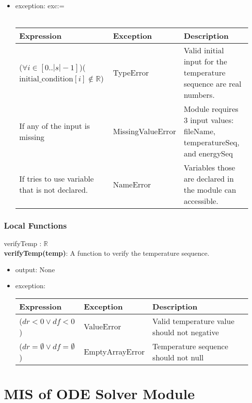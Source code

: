 \documentclass[12pt, titlepage]{article}
\begin{document}
\begin{itemize}
    
\item exception: exc:= \\ \\ 
 \begin{tabular}{p{7cm} p{3.5cm} p{4cm}}
 \hline
 \textbf{Expression} & \textbf{Exception} & \textbf{Description} \\
 \hline
     ($\forall i \in [0..|s|-1]$)($\text{initial\_condition}[i] \notin \mathbb{R}$) & TypeError & Valid initial input for the temperature sequence are real numbers. \\
  \hline
      If any of the input is missing  & MissingValueError & Module requires 3 input values: fileName, temperatureSeq, and energySeq \\
    \hline
    If tries to use variable that is not declared. & NameError & Variables those are declared in the module can accessible. \\
    \hline
 \end{tabular}
\end{itemize}

\subsubsection{Local Functions}

verifyTemp : $\mathbb{R}$ \\ 
\textbf{verifyTemp(temp)}:  A function to verify the temperature sequence. 
\begin{itemize}
    \item  output: None 
    \item  exception: \\

 \begin{tabular}{p{4.3cm} p{3.3cm} p{6cm}}
 \hline
 \textbf{Expression} & \textbf{Exception} & \textbf{Description} \\
  \hline
    ($dr < 0 \vee df < 0 $) & ValueError & Valid temperature value should not negative \\
    \hline 
    ($dr = \emptyset \vee df = \emptyset $) & EmptyArrayError &  Temperature sequence should not null \\
    \hline
 \end{tabular}
\end{itemize}

\newpage
\section{MIS of ODE Solver Module} \label{ODE_Solver_Module} 
\end{document}
